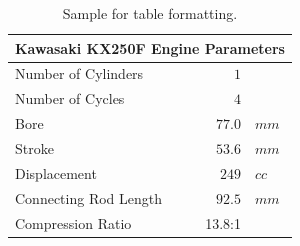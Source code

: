 \documentclass[10pt,twocolumn]{article}
\begin{document}
\begin{table}[htbp]
\center
	\begin{tabular}{ l r l}
		\multicolumn{3}{l}{Kawasaki KX250F Engine Parameters} \\ \hline
		Number of Cylinders & $1$ &\\
		Number of Cycles & $4$ &\\
		Bore & $77.0$ & $mm$\\
		Stroke & $53.6$ & $mm$\\ 
		Displacement & $249$ & $cc$\\ 
		Connecting Rod Length & $92.5$ &$mm$\\
		Compression Ratio & 13.8:1 & \\
	\end{tabular}
	\caption{Sample for table formatting.}
	\label{tab:engine}
\end{table}
\end{document}
